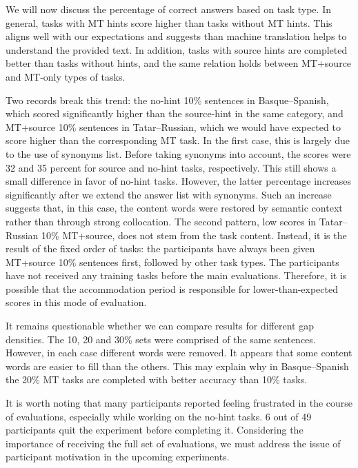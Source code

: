 \documentclass[11pt]{article}
\newcommand{\comment}[1]{}
\begin{document}
We will now discuss the percentage of correct answers based on task type. In general, tasks with MT hints score higher than tasks without MT hints. This aligns well with our expectations and suggests than machine translation helps to understand the provided text. In addition, tasks with source hints are completed better than tasks without hints, and the same relation holds between MT+source and MT-only types of tasks. 

Two records break this trend: the no-hint 10\% sentences in Basque--Spanish, which scored significantly higher than the source-hint in the same category, and MT+source 10\% sentences in Tatar--Russian, which we would have expected to score higher than the corresponding MT task. In the first case, this is largely due to the use of synonyms list. Before taking synonyms into account, the scores were 32 and 35 percent for source and no-hint tasks, respectively. This still shows a small difference in favor of no-hint tasks. However, the latter percentage increases significantly after we extend the answer list with synonyms. Such an increase suggests that, in this case, the content words were restored by 
semantic context rather than through strong collocation. The second pattern, low scores in Tatar--Russian 10\% MT+source, does not stem from the task content. Instead, it is the result of the fixed order of tasks: the participants have always been given MT+source 10\% sentences first, followed by other task types. \comment{MLF: Why? Not random? \cite{oregan13} did random! Why was this changed?}The participants have not received any training tasks before the main evaluations. Therefore, it is possible that the accommodation period is responsible for lower-than-expected scores in this mode of evaluation. 

It remains questionable whether we can compare results for different gap densities. The 10, 20 and 30\% sets were comprised
of the same sentences. However, in each case different words were removed. It appears
that some content words are easier to fill than the others. This may explain why in
Basque--Spanish the 20\% MT tasks are completed with better accuracy than 10\% tasks.\comment{MLF: I think this shows that our statistics are weak, should we say something to excuse ourselves?}

It is worth noting that many participants reported feeling frustrated in
the course of evaluations, especially while working on the no-hint tasks. 6 out of 49
participants quit the experiment before completing it. Considering the importance of receiving the full set of evaluations, we must address the issue of participant motivation in the upcoming experiments.
\end{document}
